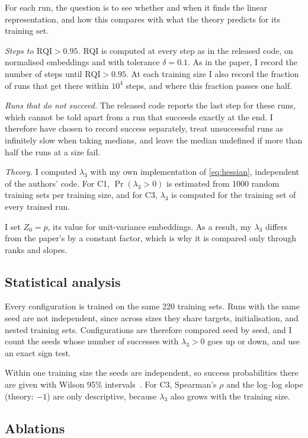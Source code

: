 For each run, the question is to see whether and when it finds the linear representation, and how this compares with what the theory predicts for its training set.

\emph{Steps to $\mathrm{RQI} > 0.95$.} RQI is computed at every step as in
the released code, on normalised embeddings and with tolerance $\delta = 0.1$.
As in the paper, I record the number of steps until $\mathrm{RQI} > 0.95$.
At each training size I also record the fraction of runs that get there
within $10^4$ steps, and where this fraction passes one half.

\emph{Runs that do not succeed.} The released code reports
the last step for these runs, which cannot be told
apart from a run that succeeds exactly at the end. I therefore have chosen to record success separately, treat unsuccessful runs as infinitely slow when taking
medians, and leave the median undefined if more than half the runs at a size
fail.

\emph{Theory.} I computed $\lambda_3$ with my own implementation of
\eqref{eq:hessian}, independent of the authors' code. For C1, $\Pr(\lambda_3 > 0)$ is estimated from 1000 random training sets per training size, and for C3, $\lambda_3$ is computed for the training set of every trained run.

I set $Z_0 = p$, its value for unit-variance embeddings. As a result, my $\lambda_3$ differs from the paper's by a constant factor, which is why it is compared only through ranks and slopes.

\subsection{Statistical analysis}
\label{sec:stats}

Every configuration is trained on the same 220 training sets. Runs with the
same seed are not independent, since across sizes they share targets,
initialisation, and nested training sets. Configurations are therefore compared seed by seed, and I count the seeds whose number of successes with
$\lambda_3 > 0$ goes up or down, and use an exact sign test.

Within one training size the seeds are independent, so success probabilities
there are given with Wilson 95\% intervals~\cite{wilson1927probable}. For C3,
Spearman's $\rho$ and the log--log slope (theory: $-1$) are only descriptive,
because $\lambda_3$ also grows with the training size.

\subsection{Ablations}
\label{sec:ablations-setup}

